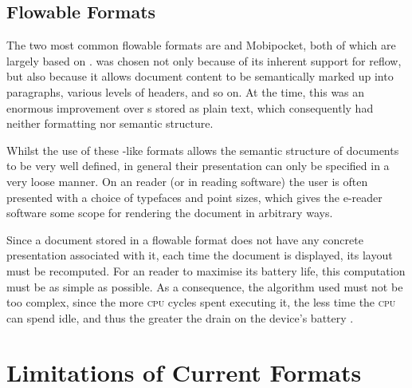 

\subsection{Flowable Formats}
\label{sec:flowableformats}

The two most common flowable \ebook{} formats are \epub{} and Mobipocket, both of which are largely based on \html{} \cite{IDPF2011}. \html{} was chosen not only because of its inherent support for reflow, but also because it allows document content to be semantically marked up into paragraphs, various levels of headers, and so on. At the time, this was an enormous improvement over \ebook{}s stored as plain text, which consequently had neither formatting nor semantic structure. 

Whilst the use of these \html{}-like formats allows the semantic structure of documents to be very well defined, in general their presentation can only be specified in a very loose manner. On an \ebook{} reader (or in \ebook{} reading software) the user is often presented with a choice of typefaces and \gls{point} sizes, which gives the e-reader software some scope for rendering the document in arbitrary ways.

Since a document stored in a flowable format does not have any concrete presentation associated with it, each time the document is displayed, its layout must be recomputed. For an \ebook{} reader to maximise its battery life, this computation must be as simple as possible. As a consequence, the algorithm used must not be too complex, since the more \textsc{cpu} cycles spent executing it, the less time the \textsc{cpu} can spend idle, and thus the greater the drain on the device's battery \cite{Pinkney2011}.


\section{Limitations of Current Formats}

